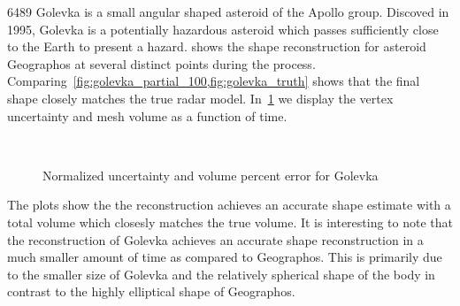 \num{6489} Golevka is a small angular shaped asteroid of the Apollo group.
Discoved in \num{1995}, Golevka is a potentially hazardous asteroid which passes sufficiently close to the Earth to present a hazard.
 shows the shape reconstruction for asteroid Geographos at several distinct points during the process.
Comparing~\cref{fig:golevka_partial_100,fig:golevka_truth} shows that the final shape closely matches the true radar model.
In~\cref{fig:golevka_metrics} we display the vertex uncertainty and mesh volume as a function of time.
\begin{figure}[htbp]
    \centering
    ~
    \caption{Normalized uncertainty and volume percent error for Golevka\label{fig:golevka_metrics}}
\end{figure}
The plots show the the reconstruction achieves an accurate shape estimate with a total volume which closesly matches the true volume.
It is interesting to note that the reconstruction of Golevka achieves an accurate shape reconstruction in a much smaller amount of time as compared to Geographos.
This is primarily due to the smaller size of Golevka and the relatively spherical shape of the body in contrast to the highly elliptical shape of Geographos.
